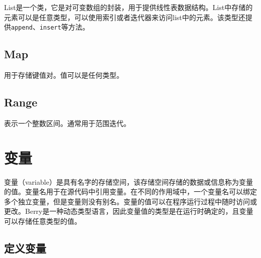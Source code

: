 List是一个类，它是对可变数组的封装，用于提供线性表数据结构。List中存储的元素可以是任意类型，可以使用索引或者迭代器来访问list中的元素。该类型还提供\texttt{append}、\texttt{insert}等方法。

\subsection{Map}

用于存储键值对。值可以是任何类型。

\subsection{Range}

表示一个整数区间。通常用于范围迭代。

\section{变量}

变量（variable）是具有名字的存储空间，该存储空间存储的数据或信息称为变量的值。变量名用于在源代码中引用变量。在不同的作用域中，一个变量名可以绑定多个独立变量，但是变量则没有别名。变量的值可以在程序运行过程中随时访问或更改。Berry是一种动态类型语言，因此变量值的类型是在运行时确定的，且变量可以存储任意类型的值。

\subsection{定义变量}

